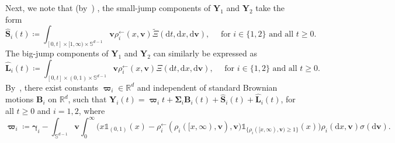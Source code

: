 \documentclass[en,oneside,bbfont,article]{amsart}
\theoremstyle{remark}
\theoremstyle{definition}
\theoremstyle{definition}
\newcommand\ve{\varepsilon}
\newcommand\Sp{\mathbb{S}}
\newcommand\R{\mathbb{R}}
\newcommand\1{\mathds{1}}
\newcommand\la{\leftarrow}
\renewcommand\ge{\geqslant}
\newcommand{\D}{\mathrm{d}}
\newcommand{\wt}[1]{\widetilde{#1}}
\newcommand{\wh}[1]{\widehat{#1}}
\begin{document}
Next, we note that (by~\cite[Prop.~3.3]{WassersteinPaper})%
, the small-jump components of $\bm{Y}_1$ and $\bm{Y}_2$ take the form
\begin{equation}\label{eq:comono_coupling_1}    \wh{\bm{S}}_i(t)\!\coloneqq\!\!\int_{[0,t]\times [1,\infty)\times \Sp^{d-1}}
\!\!\bm{v}\rho_{i}^{\la}(x,\bm{v})\wt \Xi(\D t, \D x, \D \bm{v}), \quad \text{ for }i \in \{1,2\} \text{ and all }t\ge 0. %
\end{equation}
The big-jump components of $\bm{Y}_1$ and $\bm{Y}_2$ can similarly be expressed as
\begin{equation}\label{eq:comono_coupling_2}
\wh{\bm{L}}_i(t)\coloneqq \int_{[0,t]\times (0,1)\times \Sp^{d-1}}\bm{v}\rho_{i}^{\la}(x,\bm{v}) \Xi(\D t, \D x, \D \bm{v}), \quad \text{ for }i \in \{1,2\} \text{ and all }t\ge 0. %
\end{equation} 
By~\cite[Prop.~3.3]{WassersteinPaper}, there exist constants $\bm{\varpi}_{i}\in\R^d$ and independent of standard Brownian motions $\bm{B}_i$ on $\R^d$, such that $\bm{Y}_i(t)= \bm{\varpi}_{i}t+\bm{\Sigma}_{i}\bm{B}_i(t)+\wh{\bm{S}}_{i}(t)+\wh{\bm{L}}_{i}(t)$, for all $t\ge 0$ and $i=1,2$, where
\begin{equation*}
    \bm{\varpi}_i \coloneqq \bm{\gamma}_i - \int_{\Sp^{d-1}} \bm{v} \int_0^\infty \big(x\1_{(0,1)}(x)-\rho_i^{\la}(\rho_i([x,\infty),\bm{v}),\bm{v})\1_{\{\rho_i([x,\infty),\bm{v})\ge 1\}}(x)\big) \rho_i(\D x,\bm{v})  \sigma(\D \bm{v}).
\end{equation*} 
 
\end{document}

